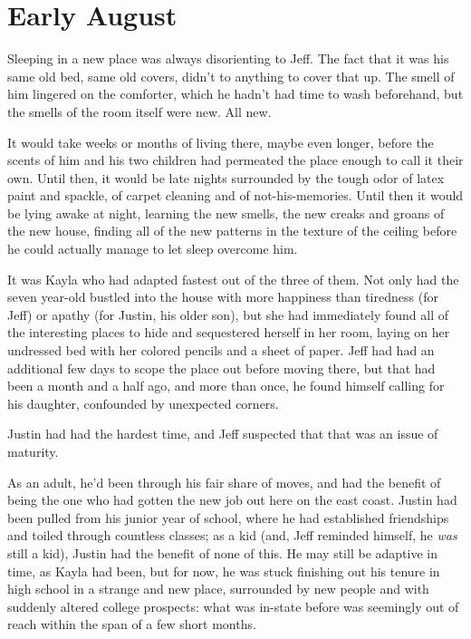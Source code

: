 \chapter{Early August}

Sleeping in a new place was always disorienting to Jeff.  The fact that it was his same old bed, same old covers, didn't to anything to cover that up.  The smell of him lingered on the comforter, which he hadn't had time to wash beforehand, but the smells of the room itself were new.  All new.

It would take weeks or months of living there, maybe even longer, before the scents of him and his two children had permeated the place enough to call it their own.  Until then, it would be late nights surrounded by the tough odor of latex paint and spackle, of carpet cleaning and of not-his-memories.  Until then it would be lying awake at night, learning the new smells, the new creaks and groans of the new house, finding all of the new patterns in the texture of the ceiling before he could actually manage to let sleep overcome him.

It was Kayla who had adapted fastest out of the three of them.  Not only had the seven year-old bustled into the house with more happiness than tiredness (for Jeff) or apathy (for Justin, his older son), but she had immediately found all of the interesting places to hide and sequestered herself in her room, laying on her undressed bed with her colored pencils and a sheet of paper.  Jeff had had an additional few days to scope the place out before moving there, but that had been a month and a half ago, and more than once, he found himself calling for his daughter, confounded by unexpected corners.

Justin had had the hardest time, and Jeff suspected that that was an issue of maturity.

As an adult, he'd been through his fair share of moves, and had the benefit of being the one who had gotten the new job out here on the east coast.  Justin had been pulled from his junior year of school, where he had established friendships and toiled through countless classes; as a kid (and, Jeff reminded himself, he \textit{was} still a kid), Justin had the benefit of none of this.  He may still be adaptive in time, as Kayla had been, but for now, he was stuck finishing out his tenure in high school in a strange and new place, surrounded by new people and with suddenly altered college prospects: what was in-state before was seemingly out of reach within the span of a few short months.

